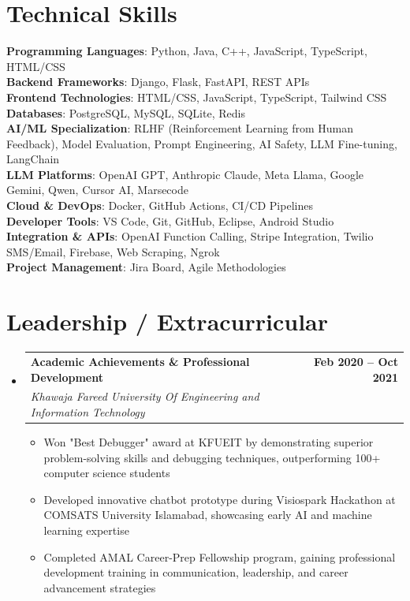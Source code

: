 \documentclass[letterpaper,11pt]{article}
\makeatletter
\newcommand{\resumeItem}[1]{
  \item\small{
    {#1 \vspace{-2pt}}
  }
}
\newcommand{\resumeSubheading}[4]{
  \vspace{-2pt}\item
    \begin{tabular*}{1.0\textwidth}[t]{l@{\extracolsep{\fill}}r}
      \textbf{#1} & \textbf{\small #2} \\
      \textit{\small#3} & \textit{\small #4} \\
    \end{tabular*}\vspace{-7pt}
}
\newcommand{\resumeSubHeadingListStart}{\begin{itemize}[leftmargin=0.0in, label={}]}
\newcommand{\resumeSubHeadingListEnd}{\end{itemize}}
\newcommand{\resumeItemListStart}{\begin{itemize}}
\newcommand{\resumeItemListEnd}{\end{itemize}\vspace{-5pt}}
\makeatother
\begin{document}
\vspace{-15pt}


%
\section{Technical Skills}
 \begin{itemize}[leftmargin=0.15in, label={}]
    \small{\item{
     \textbf{Programming Languages}{: Python, Java, C++, JavaScript, TypeScript, HTML/CSS} \\
     \textbf{Backend Frameworks}{: Django, Flask, FastAPI, REST APIs} \\
     \textbf{Frontend Technologies}{: HTML/CSS, JavaScript, TypeScript, Tailwind CSS} \\
     \textbf{Databases}{: PostgreSQL, MySQL, SQLite, Redis} \\
     \textbf{AI/ML Specialization}{: RLHF (Reinforcement Learning from Human Feedback), Model Evaluation, Prompt Engineering, AI Safety, LLM Fine-tuning, LangChain} \\
     \textbf{LLM Platforms}{: OpenAI GPT, Anthropic Claude, Meta Llama, Google Gemini, Qwen, Cursor AI, Marsecode} \\
     \textbf{Cloud \& DevOps}{: Docker, GitHub Actions, CI/CD Pipelines} \\
     \textbf{Developer Tools}{: VS Code, Git, GitHub, Eclipse, Android Studio} \\
     \textbf{Integration \& APIs}{: OpenAI Function Calling, Stripe Integration, Twilio SMS/Email, Firebase, Web Scraping, Ngrok} \\
     \textbf{Project Management}{: Jira Board, Agile Methodologies} \\
    }}
 \end{itemize}
 \vspace{-16pt}


\section{Leadership / Extracurricular}
    \resumeSubHeadingListStart
        \resumeSubheading{Academic Achievements \& Professional Development}{Feb 2020 -- Oct 2021}{Khawaja Fareed University Of Engineering and Information Technology}{}
            \resumeItemListStart
                \resumeItem{Won "Best Debugger" award at KFUEIT by demonstrating superior problem-solving skills and debugging techniques, outperforming 100+ computer science students}
                \resumeItem{Developed innovative chatbot prototype during Visiospark Hackathon at COMSATS University Islamabad, showcasing early AI and machine learning expertise}
                \resumeItem{Completed AMAL Career-Prep Fellowship program, gaining professional development training in communication, leadership, and career advancement strategies}
            \resumeItemListEnd
        
    \resumeSubHeadingListEnd
\end{document}

